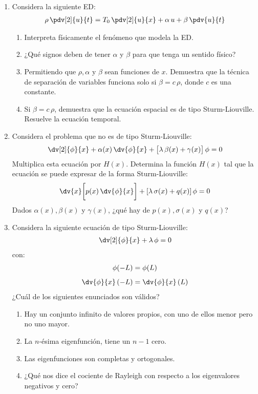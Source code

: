 \begin{enumerate}
\item Considera la siguiente ED:
\begin{align*}
\rho \, \pdv[2]{u}{t} = T_{0} \, \pdv[2]{u}{x} + \alpha \, u + \beta \, \pdv{u}{t}
\end{align*}
\begin{enumerate}[label=\alph*)]
\item Interpreta físicamente el fenómeno que modela la ED.
\item ¿Qué signos deben de tener $\alpha$ y $\beta$ para que tenga un sentido físico?
\item Permitiendo que $\rho, \alpha$ y $\beta$ sean funciones de $x$. Demuestra que la técnica de separación de variables funciona solo si $\beta = c \, \rho$, donde $c$ es una constante.
\item Si $\beta = c \, \rho$, demuestra que la ecuación espacial es de tipo Sturm-Liouville. Resuelve la ecuación temporal.
\end{enumerate}
\item Considera el problema que no es de tipo Sturm-Liouville:
\begin{align*}
\dv[2]{\phi}{x} + \alpha (x) \, \dv{\phi}{x} + \big[ \lambda \, \beta (x) + \gamma (x) \big] \, \phi = 0
\end{align*}
Multiplica esta ecuación por $H (x)$. Determina la función $H (x)$ tal que la ecuación se puede expresar de la forma Sturm-Liouville:
\begin{align*}
\dv{x} \bigg[ p (x) \, \dv{\phi}{x} \bigg] + [ \lambda \, \sigma (x) + q (x) ] \, \phi = 0
\end{align*}
Dados $\alpha (x), \beta (x)$ y $\gamma (x)$, ¿qué hay de $p (x), \sigma (x)$ y $q (x)$?
\item Considera la siguiente ecuación de tipo Sturm-Liouville:
\begin{align*}
\dv[2]{\phi}{x} + \lambda \, \phi = 0
\end{align*}
con:
\begin{align*}
\phi (-L) &= \phi (L) \\[0.5em]
\dv{\phi}{x} \, (-L) &= \dv{\phi}{x} \, (L)
\end{align*}
¿Cuál de los siguientes enunciados son válidos?
\begin{enumerate}[label=\roman*)]
\item Hay un conjunto infinito de valores propios, con uno de ellos menor pero no uno mayor.
\item La $n$-ésima eigenfunción, tiene un $n-1$ cero.
\item Las eigenfunciones son completas y ortogonales.
\item ¿Qué nos dice el cociente de Rayleigh con respecto a los eigenvalores negativos y cero?
\end{enumerate}


\end{enumerate}
